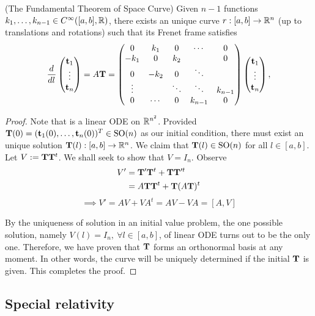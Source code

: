 \begin{theorem}
	(The Fundamental Theorem of Space Curve) Given $n-1$ functions $k_1, \dots, k_{n-1} \in C^{\infty}([a, b], \mathbb{R})$, there exists an unique curve $r:[a, b] \rightarrow \mathbb{R}^n$ (up to translations and rotations) such that its Frenet frame satisfies
	\begin{equation}
	\frac{d^{}  }{d l^{}}
	\begin{pmatrix}
	\mathbf{t}_1 \\
	\vdots \\
	\mathbf{t}_n
	\end{pmatrix}
	= A\mathbf{T}
	=
	\begin{pmatrix}
	0       &  k_1	&   0    & \cdots & 0	\\
	-k_1    &   0	& 	k_2  &		  & 0	\\
	0       & -k_2	& 	0	 & \ddots &  	\\
	\vdots  &		& \ddots & \ddots & k_{n-1}   \\
	0		&\cdots	&	0	 & k_{n-1}& 0
	\end{pmatrix}
	\begin{pmatrix}
	\mathbf{t}_1 \\
	\vdots \\
	\mathbf{t}_{n}
	\end{pmatrix},
	\label{eq:frenet_n}
	\end{equation}
	
	\begin{proof}
		Note that  is a linear ODE on $\mathbb{R}^{n^2}$. Provided $\mathbf{T}(0) = (\mathbf{t}_1(0), \dots, \mathbf{t}_n(0))^{T} \in \text{SO}(n)$ as our initial condition, there must exist an unique solution $\mathbf{T}(l):[a, b] \rightarrow \mathbb{R}^{n}$. We claim that $\mathbf{T}(l) \in \text{SO}(n)$ for all $l \in [a, b]$. Let $V := \mathbf{T}\mathbf{T}^{t}$. We shall seek to show that $V = I_n$. Observe
		\begin{align*}
			V'  &= \mathbf{T}'\mathbf{T}^t + \mathbf{T}\mathbf{T}'^t \\
				&= A\mathbf{T}\mathbf{T}^t + \mathbf{T}(A\mathbf{T})^t
		\end{align*}
		\begin{equation}
			\implies V' = AV + VA^t = AV - VA = [A, V]
			\label{eq:ode_frenet}
		\end{equation}
		
		By the uniqueness of solution in an initial value problem, the one possible solution, namely $V(l) = I_n,~\forall l \in [a, b]$, of linear ODE  turns out to be the only one. Therefore, we have proven that $\mathbf{T}$ forms an orthonormal basis at any moment. In other words, the curve will be uniquely determined if the initial $\mathbf{T}$ is given. This completes the proof.
	\end{proof}
	
	\subsection{Special relativity}
	
\end{theorem}